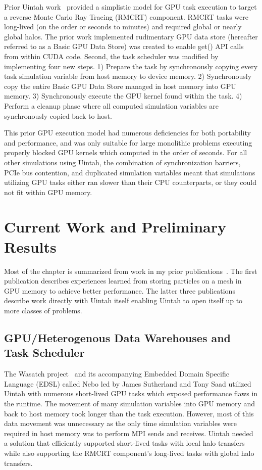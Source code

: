 \documentclass[12pt]{article}
\begin{document}
Prior Uintah work~\cite{wolfhpc12} provided a simplistic model for GPU task execution to target a reverse Monte Carlo Ray Tracing (RMCRT) component.  RMCRT tasks were long-lived (on the order or seconds to minutes) and required global or nearly global halos.  The prior work implemented rudimentary GPU data store (hereafter referred to as a Basic GPU Data Store) was created to enable get() API calls from within CUDA code.  Second, the task scheduler was modified by implementing four new steps.  1) Prepare the task by synchronously copying every task simulation variable from host memory to device memory. 2) Synchronously copy the entire Basic GPU Data Store managed in host memory into GPU memory.  3) Synchronously execute the GPU kernel found within the task.  4) Perform a cleanup phase where all computed simulation variables are synchronously copied back to host.  
	
This prior GPU execution model had numerous deficiencies for both portability and performance, and was only suitable for large monolithic problems executing properly blocked GPU kernels which computed in the order of seconds.  For all other simulations using Uintah, the combination of synchronization barriers, PCIe bus contention, and duplicated simulation variables meant that simulations utilizing GPU tasks either ran slower than their CPU counterparts, or they could not fit within GPU memory.  

\section{Current Work and Preliminary Results}
\label{ch:uintah_current}

Most of the chapter is summarized from work in my prior publications~\cite{saahpc-2010-brad, wolfhpc15,ijpp16, espm2-brad}.  The first publication describes experiences learned from storing particles on a mesh in GPU memory to achieve better performance.  The latter three publications describe work directly with Uintah itself enabling Uintah to open itself up to more classes of problems.  

\subsection{GPU/Heterogenous Data Warehouses and Task Scheduler}
\label{ch:data warehouses}

The Wasatch project~\cite{wasatch-2015} and its accompanying Embedded Domain Specific Language (EDSL) called Nebo \cite{nebo_2015, sutherland_discrete_2011} led by James Sutherland and Tony Saad utilized Uintah with numerous short-lived GPU tasks which exposed performance flaws in the runtime.  The movement of many simulation variables into GPU memory and back to host memory took longer than the task execution.  However, most of this data movement was unnecessary as the only time simulation variables were required in host memory was to perform MPI sends and receives.  Uintah needed a solution that efficiently supported short-lived tasks with local halo transfers while also supporting the RMCRT component's long-lived tasks with global halo transfers.
\end{document}
